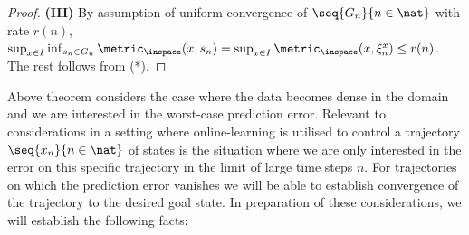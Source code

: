 \begin{thm}
\begin{proof}
\textbf{(III)} By assumption of uniform convergence of $\seq{G_n}{n \in \nat}$ with rate $r(n)$, $\sup_{x \in I} \inf_{s_n \in G_n} \metric_{\inspace} (x,s_n) =\sup_{x \in I} \metric_{\inspace} (x,\xi_n^x) \leq r(n)$. The rest follows from (*).
\end{proof}
\end{thm}




Above theorem considers the case where the data becomes dense in the domain and we are interested in the worst-case prediction error. Relevant to considerations in a setting where online-learning is utilised to control a trajectory $\seq{x_n}{n \in \nat}$ of states is the situation where we are only interested in the error on this specific trajectory in the limit of large time steps $n$. For trajectories on which the prediction error vanishes we will be able to establish convergence of the trajectory to the desired goal state.
In preparation of these considerations, we will establish the following facts:


